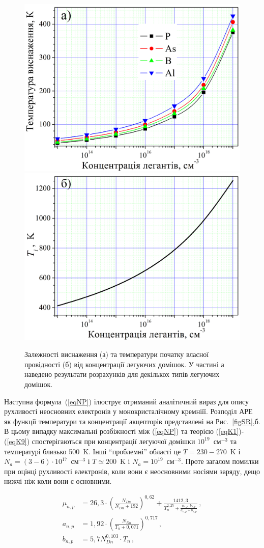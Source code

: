 \documentclass[12pt,a4paper,titlepage,oneside]{book}
\numberwithin{equation}{part}
\begin{document}
\begin{figure}
	\centering
     \includegraphics[width=0.49\linewidth]{FigTs.png}
     \includegraphics[width=0.49\linewidth]{FigTi.png}
	  \caption{Залежності виснаження (а) та температури початку власної провідності (б)
від концентрації легуючих домішок. У частині а наведено результати розрахунків для декількох типів легуючих домішок.
}\label{figTsTi}
\end{figure}

Наступна формула~(\ref{eqNP}) ілюструє отриманий аналітичний вираз для опису рухливості неосновних електронів у
монокристалічному кремніїї.
Розподіл АРЕ як функції температури та концентрації акцепторів представлені на Рис.~\ref{figSR},б.
В цьому випадку максимальні розбіжності між (\ref{eqNP}) та теорією (\ref{eqK1})-(\ref{eqK9}) спостерігаються при
концентрації легуючої домішки $10^{19}$~см$^{-3}$ та температурі близько 500~K.
Інші ``проблемні'' області це $T=230-270$~K і $N_a=(3-6)\cdot 10^{17}$~см$^{-3}$ і
$T\simeq200$~K і $N_a=10^{19}$~см$^{-3}$.
Проте загалом помилки при оцінці рухливості електронів, коли вони є неосновними носіями заряду, дещо нижчі
ніж коли вони є основними.

\begin{subequations} \label{eqNP}
    \begin{align}
      \mu_{n,p}& =26,3\cdot\left(\frac{N_{Dn}}{N_{Dn}+192}\right)^{0,62}+\frac{1412,3}{T_n^{2,25}+\frac{a_{n,p}\cdot b_{n,p}}{a_{n,p}+b_{n,p}}}\,, \label{eqNPa} \\
      a_{n,p} &=1,92\cdot\left(\frac{N_{Dn}}{T_n+0,071}\right)^{0,717}\,, \label{eqNPb} \\
      b_{n,p}& =5,7N_{Dn}^{0,103}\cdot T_n\,, \label{eqNPc}
    \end{align}
\end{subequations}
\end{document}

